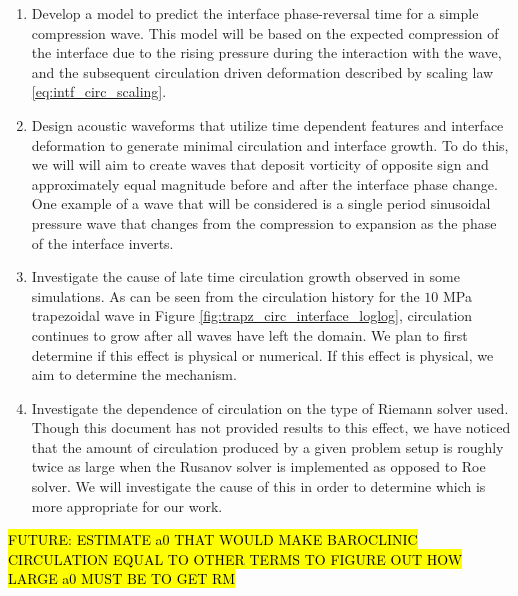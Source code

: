 \begin{itemize}
\begin{enumerate}
  \item Develop a model to predict the interface phase-reversal time
    for a simple compression wave. This model will be based on the
    expected compression of the interface due to the rising pressure
    during the interaction with the wave, and the subsequent
    circulation driven deformation described by scaling law
    \eqref{eq:intf_circ_scaling}.
  \item Design acoustic waveforms that utilize time dependent features
    and interface deformation to generate minimal circulation and
    interface growth. To do this, we will will aim to create waves
    that deposit vorticity of opposite sign and approximately equal
    magnitude before and after the interface phase change. One example
    of a wave that will be considered is a single period sinusoidal
    pressure wave that changes from the compression to expansion as
    the phase of the interface inverts.
  \item Investigate the cause of late time circulation growth observed
    in some simulations. As can be seen from the circulation history
    for the $10$ MPa trapezoidal wave in Figure
    \ref{fig:trapz_circ_interface_loglog}, circulation continues to
    grow after all waves have left the domain. We plan to first
    determine if this effect is physical or numerical. If this effect
    is physical, we aim to determine the mechanism.
  \item Investigate the dependence of circulation on the type of
    Riemann solver used. Though this document has not provided results
    to this effect, we have noticed that the amount of circulation
    produced by a given problem setup is roughly twice as large when
    the Rusanov solver is implemented as opposed to Roe solver. We
    will investigate the cause of this in order to determine which is
    more appropriate for our work.
  \end{enumerate}
\end{itemize}

\hl{FUTURE: ESTIMATE a0 THAT WOULD MAKE BAROCLINIC CIRCULATION EQUAL TO OTHER TERMS TO FIGURE OUT HOW LARGE a0 MUST BE TO GET RM}





